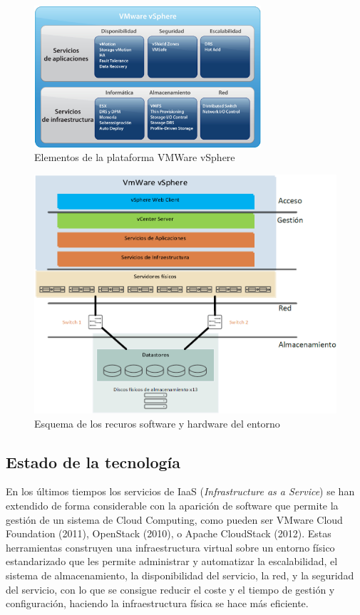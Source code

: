 \begin{figure}[hp]
  \centering
  \includegraphics[width=0.75\textwidth]{imaxes/cap2recursos/contentVSphere}
  \caption{Elementos de la plataforma VMWare vSphere\cite{fotovSphere}}
  \label{fig:componentesVSphere}
\end{figure}
\begin{figure}[hp]
  \centering
  \includegraphics[width=1\textwidth]{imaxes/cap2recursos/recursosReal.png}
  \caption{Esquema de los recuros software y hardware del entorno}
  \label{fig:esquemaentornoreal}
\end{figure}

\FloatBarrier
\subsection{Estado de la tecnología}

En los últimos tiempos los servicios de IaaS (\textit{Infrastructure as a Service}) se han extendido de forma considerable con la aparición de software que permite la gestión de un sistema de Cloud Computing, como pueden ser VMware Cloud Foundation (2011), OpenStack (2010), o Apache CloudStack (2012). Estas herramientas construyen una infraestructura virtual sobre un entorno físico estandarizado que les permite administrar y automatizar la escalabilidad, el sistema de almacenamiento, la disponibilidad del servicio, la red, y la seguridad del servicio, con lo que se consigue reducir el coste y el tiempo de gestión y configuración, haciendo la infraestructura física se hace más eficiente.


